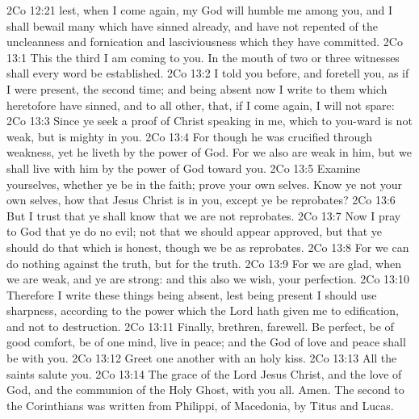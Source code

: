\vs 2Co 12:21  lest, when I come again, my God will humble me among you, and  I shall bewail many which have sinned already, and have not repented of the uncleanness and fornication and lasciviousness which they have committed.
\vs 2Co 13:1 This  the third  I am coming to you. In the mouth of two or three witnesses shall every word be established.
\vs 2Co 13:2 I told you before, and foretell you, as if I were present, the second time; and being absent now I write to them which heretofore have sinned, and to all other, that, if I come again, I will not spare:
\vs 2Co 13:3 Since ye seek a proof of Christ speaking in me, which to you-ward is not weak, but is mighty in you.
\vs 2Co 13:4 For though he was crucified through weakness, yet he liveth by the power of God. For we also are weak in him, but we shall live with him by the power of God toward you.
\vs 2Co 13:5 Examine yourselves, whether ye be in the faith; prove your own selves. Know ye not your own selves, how that Jesus Christ is in you, except ye be reprobates?
\vs 2Co 13:6 But I trust that ye shall know that we are not reprobates.
\vs 2Co 13:7 Now I pray to God that ye do no evil; not that we should appear approved, but that ye should do that which is honest, though we be as reprobates.
\vs 2Co 13:8 For we can do nothing against the truth, but for the truth.
\vs 2Co 13:9 For we are glad, when we are weak, and ye are strong: and this also we wish,  your perfection.
\vs 2Co 13:10 Therefore I write these things being absent, lest being present I should use sharpness, according to the power which the Lord hath given me to edification, and not to destruction.
\vs 2Co 13:11 Finally, brethren, farewell. Be perfect, be of good comfort, be of one mind, live in peace; and the God of love and peace shall be with you.
\vs 2Co 13:12 Greet one another with an holy kiss.
\vs 2Co 13:13 All the saints salute you.
\vs 2Co 13:14 The grace of the Lord Jesus Christ, and the love of God, and the communion of the Holy Ghost,  with you all. Amen. The second  to the Corinthians was written from Philippi,  of Macedonia, by Titus and Lucas.
